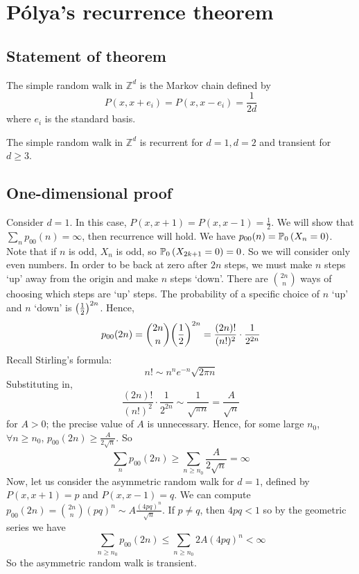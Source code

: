 \section{P\'olya's recurrence theorem}

\subsection{Statement of theorem}
\begin{definition}
	The simple random walk in \( \mathbb Z^d \) is the Markov chain defined by
	\[
		P(x,x+e_i) = P(x,x-e_i) = \frac{1}{2d}
	\]
	where \( e_i \) is the standard basis.
\end{definition}
\begin{theorem}
	The simple random walk in \( \mathbb Z^d \) is recurrent for \( d = 1, d = 2 \) and transient for \( d \geq 3 \).
\end{theorem}

\subsection{One-dimensional proof}
Consider \( d = 1 \).
In this case, \( P(x,x+1) = P(x,x-1) = \frac{1}{2} \).
We will show that \( \sum_n p_{00}(n) = \infty \), then recurrence will hold.
We have \( p_{00}(n) = \mathbb{P}_{0}\left({X_n = 0}\right) \).
Note that if \( n \) is odd, \( X_n \) is odd, so \( \mathbb{P}_{0}\left({X_{2k+1} = 0}\right) = 0 \).
So we will consider only even numbers.
In order to be back at zero after \( 2n \) steps, we must make \( n \) steps `up' away from the origin and make \( n \) steps `down'.
There are \( \binom{2n}{n} \) ways of choosing which steps are `up' steps.
The probability of a specific choice of \( n \) `up' and \( n \) `down' is \( \qty(\frac{1}{2})^{2n} \).
Hence,
\[
	p_{00}(2n) = \binom{2n}{n} \qty(\frac{1}{2})^{2n} = \frac{(2n)!}{(n!)^2} \cdot \frac{1}{2^{2n}}
\]
Recall Stirling's formula:
\[
	n!
	\sim n^n e^{-n} \sqrt{2 \pi n}
\]
Substituting in,
\[
	\frac{(2n)!}{(n!)^2} \cdot \frac{1}{2^{2n}} \sim \frac{1}{\sqrt{\pi n}} = \frac{A}{\sqrt{n}}
\]
for \( A > 0 \); the precise value of \( A \) is unnecessary.
Hence, for some large \( n_0 \), \( \forall n \geq n_0 \), \( p_{00}(2n) \geq \frac{A}{2\sqrt{n}} \).
So
\[
	\sum_n p_{00}(2n) \geq \sum_{n \geq n_0} \frac{A}{2\sqrt{n}} = \infty
\]
Now, let us consider the asymmetric random walk for \( d = 1 \), defined by \( P(x,x+1) = p \) and \( P(x,x-1) = q \).
We can compute \( p_{00}(2n) = \binom{2n}{n} (pq)^n \sim A \frac{(4pq)^n}{\sqrt{n}} \).
If \( p \neq q \), then \( 4pq < 1 \) so by the geometric series we have
\[
	\sum_{n \geq n_0} p_{00}(2n) \leq \sum_{n \geq n_0} 2A (4pq)^n < \infty
\]
So the asymmetric random walk is transient.

